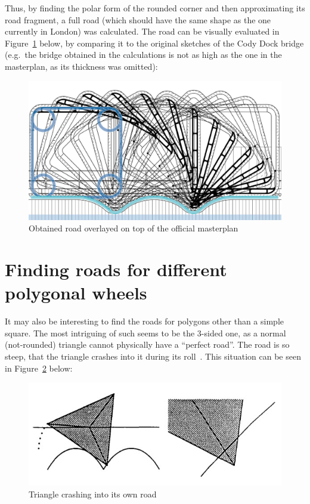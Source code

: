 \documentclass[12pt]{article}
\begin{document}
        Thus, by finding the polar form of the rounded corner and then approximating its road fragment, a full road (which should have the same shape as the one currently in London) was calculated. The road can be visually evaluated in Figure~\ref{fig:masterplan_overlayed} below, by comparing it to the original sketches of the Cody Dock bridge (e.g.\ the bridge obtained in the calculations is not as high as the one in the masterplan, as its thickness was omitted):

        \begin{figure}[H]
            \centering
            \includegraphics[width=0.8\linewidth]{images/masterplan_overlayed.png}
            \caption[Obtained road overlayed on top of the official masterplan]{Obtained road overlayed on top of the official masterplan~\cite{bridge_masterplan}}\label{fig:masterplan_overlayed}
        \end{figure}

    \section{Finding roads for different polygonal wheels}

        It may also be interesting to find the roads for polygons other than a simple square. The most intriguing of such seems to be the 3-sided one, as a normal (not-rounded) triangle cannot physically have a ``perfect road''. The road is so steep, that the triangle crashes into it during its roll~\cite{Hall_Wagon_1992}. This situation can be seen in Figure~\ref{fig:triangle_crash} below:
        \begin{figure}[H]
            \centering
            \includegraphics[width=0.7\linewidth]{images/triangle_wheel.jpg}
            \caption{Triangle crashing into its own road~\cite{Hall_Wagon_1992}}\label{fig:triangle_crash}
        \end{figure}
\end{document}

